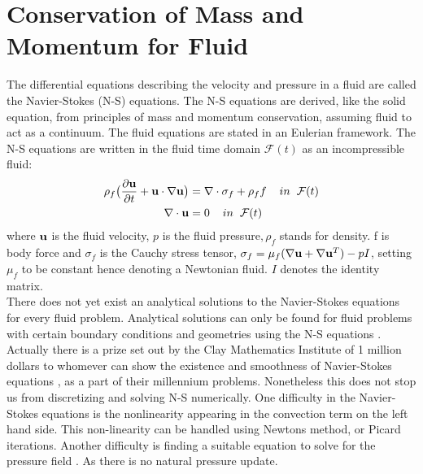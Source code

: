 \section{Conservation of Mass and Momentum for Fluid}
The differential equations describing the velocity and pressure in a fluid are called the Navier-Stokes (N-S) equations. The N-S equations are derived, like the solid equation, from principles of mass and momentum conservation, assuming fluid to act as a continuum.
The fluid equations are stated in an Eulerian framework. 
The N-S equations are written in the fluid time domain $\mathcal{F}(t)$ as an incompressible fluid:
\begin{align}
\label{eq:NS}
\rho_f\big( \frac{\partial \bold{u}}{\partial t} +  \bold{u} \cdot \nabla \bold{u}\big) &= \nabla \cdot \sigma_f + \rho_ff  \hspace{4mm} in \hspace{2mm} \mathcal{F}(t)\\
\nabla \cdot \bold{u} &= 0 \hspace{4mm} in \hspace{2mm} \mathcal{F}(t)
\end{align}
where $\bold{u}$ is the fluid velocity, $p$ is the fluid pressure$, \rho_f$ stands for density. f is body force and $\sigma_f$ is the Cauchy stress tensor, $ \sigma_f = \mu_f (\nabla \bold{u} + \nabla \bold{u}^T)  - pI$, setting $\mu_f$ to be constant hence denoting a Newtonian fluid. $I$ denotes the identity matrix. \\

There does not yet exist an analytical solutions to the Navier-Stokes equations for every fluid problem. 
Analytical solutions can only be found for fluid problems with certain boundary conditions and geometries using the N-S equations \cite{White2000}. Actually there is a prize set out by the Clay Mathematics Institute of 1 million dollars to whomever can show the existence and smoothness of Navier-Stokes equations \cite{Fefferman2000}, as a part of their millennium problems. 
Nonetheless this does not stop us from discretizing and solving N-S numerically. One difficulty in the Navier-Stokes equations is the nonlinearity appearing in the convection term on the left hand side. This non-linearity can be handled using Newtons method, or Picard iterations. Another difficulty is finding a suitable equation to solve for the pressure field \cite{Charlesworth2003}. As there is no natural pressure update. 
